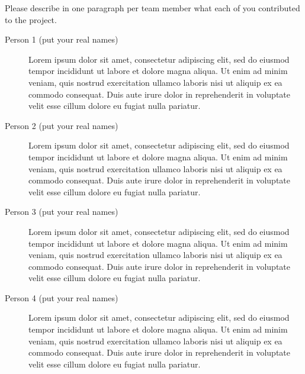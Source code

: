 Please describe in one paragraph per team member what each of you contributed to the project.
\begin{description}
\item[Person 1 (put your real names)] Lorem ipsum dolor sit amet, consectetur adipiscing elit, sed do eiusmod tempor incididunt ut labore et dolore magna aliqua. Ut enim ad minim veniam, quis nostrud exercitation ullamco laboris nisi ut aliquip ex ea commodo consequat. Duis aute irure dolor in reprehenderit in voluptate velit esse cillum dolore eu fugiat nulla pariatur. 
\item[Person 2 (put your real names)] Lorem ipsum dolor sit amet, consectetur adipiscing elit, sed do eiusmod tempor incididunt ut labore et dolore magna aliqua. Ut enim ad minim veniam, quis nostrud exercitation ullamco laboris nisi ut aliquip ex ea commodo consequat. Duis aute irure dolor in reprehenderit in voluptate velit esse cillum dolore eu fugiat nulla pariatur.
\item [Person 3 (put your real names)] Lorem ipsum dolor sit amet, consectetur adipiscing elit, sed do eiusmod tempor incididunt ut labore et dolore magna aliqua. Ut enim ad minim veniam, quis nostrud exercitation ullamco laboris nisi ut aliquip ex ea commodo consequat. Duis aute irure dolor in reprehenderit in voluptate velit esse cillum dolore eu fugiat nulla pariatur. 
\item [Person 4 (put your real names)] Lorem ipsum dolor sit amet, consectetur adipiscing elit, sed do eiusmod tempor incididunt ut labore et dolore magna aliqua. Ut enim ad minim veniam, quis nostrud exercitation ullamco laboris nisi ut aliquip ex ea commodo consequat. Duis aute irure dolor in reprehenderit in voluptate velit esse cillum dolore eu fugiat nulla pariatur.
\end{description}



